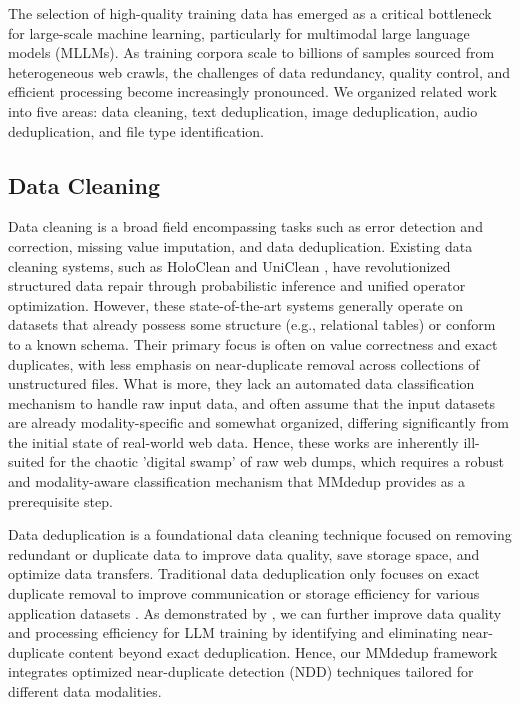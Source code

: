 \documentclass[sigconf, nonacm]{acmart}
\begin{document}
The selection of high-quality training data has emerged as a critical bottleneck for large-scale machine learning, particularly for multimodal large language models (MLLMs). As training corpora scale to billions of samples sourced from heterogeneous web crawls, the challenges of data redundancy, quality control, and efficient processing become increasingly pronounced. We organized related work into five areas: data cleaning, text deduplication, image deduplication, audio deduplication, and file type identification.

\vspace{-1mm}
\subsection{Data Cleaning}

 Data cleaning is a broad field encompassing tasks such as error detection and correction, missing value imputation, and data deduplication. Existing data cleaning systems, such as HoloClean \cite{rekatsinas2017} and UniClean \cite{ding2025}, have revolutionized structured data repair through probabilistic inference and unified operator optimization. However, these state-of-the-art systems generally operate on datasets that already possess some structure (e.g., relational tables) or conform to a known schema. Their primary focus is often on value correctness and exact duplicates, with less emphasis on near-duplicate removal across collections of unstructured files. What is more, they lack an automated data classification mechanism to handle raw input data, and often assume that the input datasets are already modality-specific and somewhat organized, differing significantly from the initial state of real-world web data. Hence, these works are inherently ill-suited for the chaotic 'digital swamp' of raw web dumps, which requires a robust and modality-aware classification mechanism that MMdedup provides as a prerequisite step.

 Data deduplication is a foundational data cleaning technique focused on removing redundant or duplicate data to improve data quality, save storage space, and optimize data transfers. Traditional data deduplication only focuses on exact duplicate removal to improve communication or storage efficiency for various application datasets \cite{Fu2025, Xia2016}. As demonstrated by \cite{lee2022deduplicating}, we can further improve data quality and processing efficiency for LLM training by identifying and eliminating near-duplicate content beyond exact deduplication. Hence, our MMdedup framework integrates optimized near-duplicate detection (NDD) techniques tailored for different data modalities.
\end{document}
